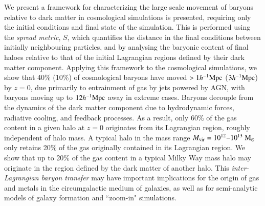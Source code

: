 We present a framework for characterizing the large scale movement of baryons
relative to dark matter in cosmological simulations is presented, requiring
only the initial conditions and final state of the simulation. This is
performed using the {\it spread metric}, $S$, which quantifies the distance
in the final conditions between initially neighbouring particles, and by
analysing the baryonic content of final haloes relative to that of the
initial Lagrangian regions defined by their dark matter component. Applying
this framework to the \simba{} cosmological simulations, we show that 40\%
(10\%) of cosmological baryons have moved $> 1h^{-1}{\rm Mpc}{}$ ($3h^{-1}{\rm Mpc}{}$) by $z=0$,
due primarily to entrainment of gas by jets powered by AGN, with baryons
moving up to $12h^{-1}{\rm Mpc}{}$ away in extreme cases. Baryons decouple from the
dynamics of the dark matter component due to hydrodynamic forces, radiative
cooling, and feedback processes. As a result, only 60\% of the gas content in
a given halo at $z=0$ originates from its Lagrangian region, roughly
independent of halo mass. A typical halo in the mass range $M_{\rm vir} =
10^{12}$--$10^{13}\;{\rm M}_{\odot}$ only retains 20\% of the gas originally contained
in its Lagrangian region. We show that up to 20\% of the gas content in a
typical Milky Way mass halo may originate in the region defined by the dark
matter of another halo. This {\it inter-Lagrangian baryon transfer} may have
important implications for the origin of gas and metals in the circumgalactic
medium of galaxies, as well as for semi-analytic models of galaxy formation
and “zoom-in" simulations.